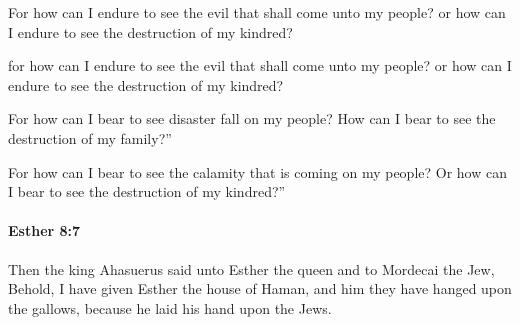 			For how can I endure to see the evil that shall come unto my people? or how can I endure to see the destruction of my kindred?

			\begin{versebox}
					\item[BHS] 
					\item[LXX] 
					\item[ASV] for how can I endure to see the evil that shall come unto my people? or how can I endure to see the destruction of my kindred?
					\item[NIV] For how can I bear to see disaster fall on my people? How can I bear to see the destruction of my family?”
					\item[NRSV] For how can I bear to see the calamity that is coming on my people? Or how can I bear to see the destruction of my kindred?”
			\end{versebox}

		\paragraph{Esther 8:7} %
			\label{ESTHER-8-7}

			Then the king Ahasuerus said unto Esther the queen and to Mordecai the Jew, Behold, I have given Esther the house of Haman, and him they have hanged upon the gallows, because he laid his hand upon the Jews.

